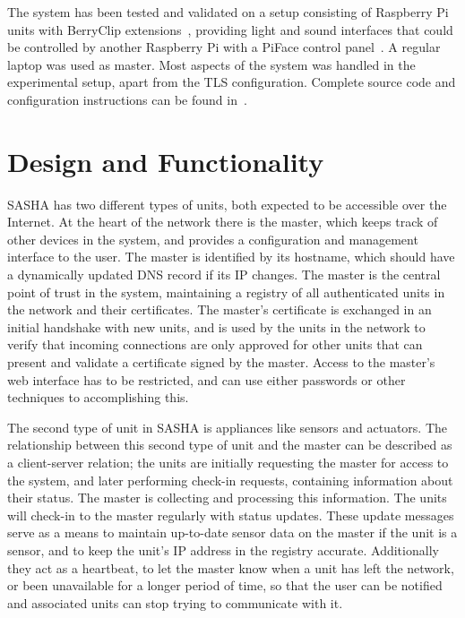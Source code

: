 The system has been tested and validated on a setup consisting of Raspberry Pi units with BerryClip extensions~\cite{berryclip}, providing light and sound interfaces that could be controlled by another Raspberry Pi with a PiFace control panel~\cite{piface}. A regular laptop was used as master. Most aspects of the system was handled in the experimental setup, apart from the TLS configuration. Complete source code and configuration instructions can be found in~\cite[the source code repository]{sasha-source}.


\section{Design and Functionality}

SASHA has two different types of units, both expected to be accessible over the Internet. At the heart of the network there is the master, which keeps track of other devices in the system, and provides a configuration and management interface to the user. The master is identified by its hostname, which should have a dynamically updated DNS record if its IP changes. The master is the central point of trust in the system, maintaining a registry of all authenticated units in the network and their certificates. The master's certificate is exchanged in an initial handshake with new units, and is used by the units in the network to verify that incoming connections are only approved for other units that can present and validate a certificate signed by the master. Access to the master's web interface has to be restricted, and can use either passwords or other techniques to accomplishing this.

The second type of unit in SASHA is appliances like sensors and actuators. The relationship between this second type of unit and the master can be described as a client-server relation; the units are initially requesting the master for access to the system, and later performing check-in requests, containing information about their status. The master is collecting and processing this information. The units will check-in to the master regularly with status updates. These update messages serve as a means to maintain up-to-date sensor data on the master if the unit is a sensor, and to keep the unit's IP address in the registry accurate. Additionally they act as a heartbeat, to let the master know when a unit has left the network, or been unavailable for a longer period of time, so that the user can be notified and associated units can stop trying to communicate with it.

